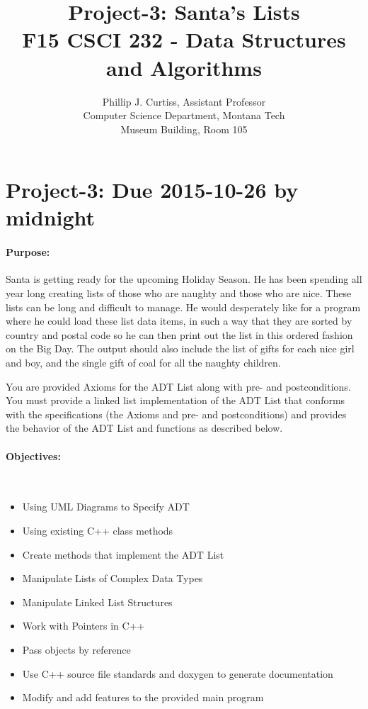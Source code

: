 \documentclass[10pt,letterpaper]{article}
\title{Project-3: Santa's Lists \\
	   F15 CSCI 232 - Data Structures and Algorithms}
\author{Phillip J. Curtiss, Assistant Professor\\
	    Computer Science Department, Montana Tech\\
		Museum Building, Room 105}
\newcounter{x}\setcounter{x}{1}
\begin{document}
\pagestyle{fancy}
\maketitle
\thispagestyle{empty}

\section*{Project-3: Due 2015-10-26 by midnight}

\paragraph{Purpose:} Santa is getting ready for the upcoming Holiday Season. He has been spending all year long creating lists of those who are naughty and those who are nice. These lists can be long and difficult to manage. He would desperately like for a program where he could load these list data items, in such a way that they are sorted by country and postal code so he can then print out the list in this ordered fashion on the Big Day. The output should also include the list of gifts for each nice girl and boy, and the single gift of coal for all the naughty children. 

You are provided Axioms for the ADT List along with pre- and postconditions. You must provide a linked list implementation of the ADT List that conforms with the specifications (the Axioms and pre- and postconditions) and provides the behavior of the ADT List and functions as described below.

\paragraph{Objectives:} ~
\begin{itemize}
	\item Using UML Diagrams to Specify ADT
	\item Using existing C++ class methods
	\item Create methods that implement the ADT List
	\item Manipulate Lists of Complex Data Types
	\item Manipulate Linked List Structures
	\item Work with Pointers in C++
	\item Pass objects by reference
	\item Use C++ source file standards and doxygen to generate documentation
	\item Modify and add features to the provided main program
\end{itemize}
\end{document}

